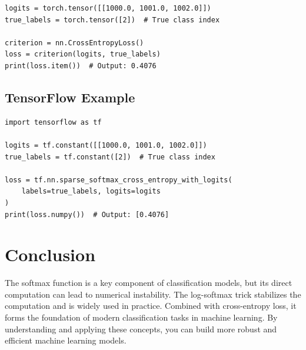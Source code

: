 \begin{notechapter}
\begin{verbatim}
logits = torch.tensor([[1000.0, 1001.0, 1002.0]])
true_labels = torch.tensor([2])  # True class index

criterion = nn.CrossEntropyLoss()
loss = criterion(logits, true_labels)
print(loss.item())  # Output: 0.4076
\end{verbatim}

\subsection{TensorFlow Example}
\begin{verbatim}
import tensorflow as tf

logits = tf.constant([[1000.0, 1001.0, 1002.0]])
true_labels = tf.constant([2])  # True class index

loss = tf.nn.sparse_softmax_cross_entropy_with_logits(
    labels=true_labels, logits=logits
)
print(loss.numpy())  # Output: [0.4076]
\end{verbatim}

\section{Conclusion}
The softmax function is a key component of classification models, but its 
direct computation can lead to numerical instability. The log-softmax trick 
stabilizes the computation and is widely used in practice. Combined with 
cross-entropy loss, it forms the foundation of modern classification tasks 
in machine learning. By understanding and applying these concepts, you can 
build more robust and efficient machine learning models.
\end{notechapter}
